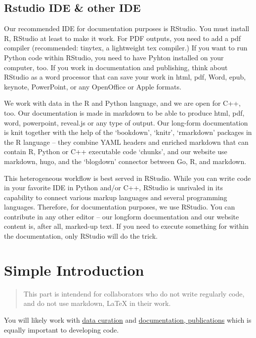 \documentclass[
  fontsize=13pt,
  english,
  a4paper,
  openany, a4paper, oneside]{book}
\begin{document}
\hypertarget{rstudio-ide-other-ide}{%
\subsection{Rstudio IDE \& other IDE}\label{rstudio-ide-other-ide}}

Our recommended IDE for documentation purposes is RStudio. You must install R, RStudio at least to make it work. For PDF outputs, you need to add a pdf compiler (recommended: tinytex, a lightweight tex compiler.) If you want to run Python code within RStudio, you need to have Pyhton installed on your computer, too. If you work in documentation and publishing, think about RStudio as a word processor that can save your work in html, pdf, Word, epub, keynote, PowerPoint, or any OpenOffice or Apple formats.

We work with data in the R and Python language, and we are open for C++, too. Our documentation is made in markdown to be able to produce html, pdf, word, powerpoint, reveal.js or any type of output. Our long-form documentation is knit together with the help of the `bookdown', `knitr', `rmarkdown' packages in the R language -- they combine YAML headers and enriched markdown that can contain R, Python or C++ executable code `chunks', and our website use markdown, hugo, and the `blogdown' connector between Go, R, and markdown.

This heterogeneous workflow is best served in RStudio. While you can write code in your favorite IDE in Python and/or C++, RStudio is unrivaled in its capability to connect various markup languages and several programming languages. Therefore, for documentation purposes, we use RStudio. You can contribute in any other editor -- our longform documentation and our website content is, after all, marked-up text. If you need to execute something for within the documentation, only RStudio will do the trick.

\hypertarget{simple-intro}{%
\section{Simple Introduction}\label{simple-intro}}

\begin{quote}
This part is intendend for collaborators who do not write regularly code, and do not use markdown, LaTeX in their work.
\end{quote}

You will likely work with \protect\hyperlink{data-curation}{data curation} and \protect\hyperlink{documentation}{documentation, publications} which is equally important to developing code.
\end{document}
